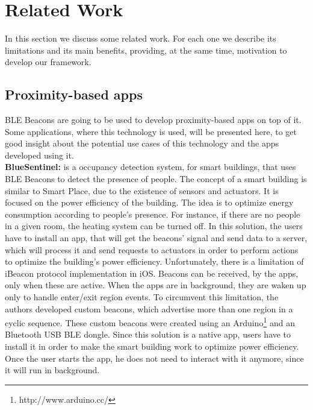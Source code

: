 
%
%

\section{Related Work}
\label{sec:related_work}
In this section we discuss some related work.
For each one we describe its limitations and its main
benefits, providing, at the same time, motivation
to develop our framework.

\subsection{Proximity-based apps}
\label{sub:ble_beacons_applications}
BLE Beacons are going to
be used to develop proximity-based apps
on top of it. Some
applications, where this technology is used,
will be presented here, to
get good insight about the potential use cases of this 
technology and the apps developed using it.
\\
\textbf{BlueSentinel\cite{Conte2014}:} is a 
occupancy detection system, for smart buildings,
that uses BLE Beacons to detect the presence of
people. The concept of a smart building
is similar to Smart Place,
due to the existence of sensors and actuators.
It is focused on the power efficiency of the
building. The idea is to optimize energy
consumption according to people's presence.
For instance, if there are no people in a given room,
the heating system can be turned off.
In this solution, the users have to install
an app, that will get the beacons' signal and
send data to a server, which will process it
and send requests to actuators in order to
perform actions to optimize the
building's power efficiency.
Unfortunately, there is a limitation
of iBeacon protocol implementation
in iOS. Beacons can be received, by the apps,
only when these are active. When the apps are in
background, they are waken up only to handle
enter/exit region events. To circumvent this
limitation, the authors developed custom
beacons, which advertise more than one region
in a cyclic sequence. These custom beacons
were created using an 
Arduino\footnote{http://www.arduino.cc/}
and an Bluetooth USB BLE dongle.
Since this solution is a native app,
users have to install it in order
to make the smart building work to
optimize power efficiency.
Once the user starts the app, he does not
need to interact with it anymore, since it
will run in background.
\\
